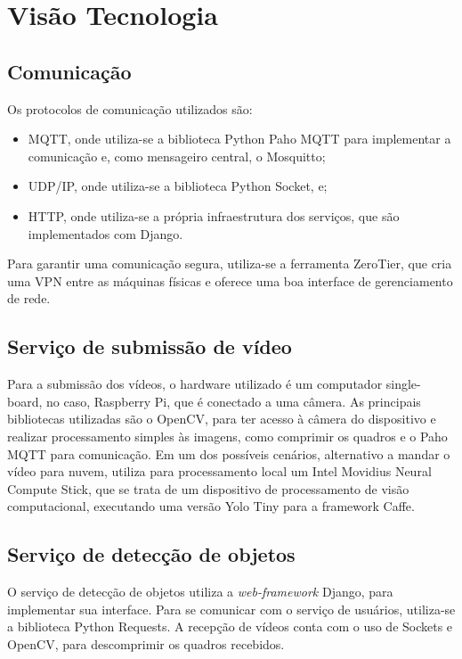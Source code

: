 \documentclass[]{politex}
\begin{document}
\section{Visão Tecnologia}

\subsection{Comunicação}
Os protocolos de comunicação utilizados são:
\begin{itemize}
    \item MQTT, onde utiliza-se a biblioteca Python Paho MQTT para implementar a comunicação e, como mensageiro central, o Mosquitto;
    \item UDP/IP, onde utiliza-se a biblioteca Python Socket, e;
    \item HTTP, onde utiliza-se a própria infraestrutura dos serviços, que são implementados com Django.
\end{itemize}

Para garantir uma comunicação segura, utiliza-se a ferramenta ZeroTier, que cria uma VPN entre as máquinas físicas e oferece uma boa interface de gerenciamento de rede.

\subsection{Serviço de submissão de vídeo}
Para a submissão dos vídeos, o hardware utilizado é um computador single-board, no caso, Raspberry Pi, que é conectado a uma câmera. As principais bibliotecas utilizadas são o OpenCV, para ter acesso à câmera do dispositivo e realizar processamento simples às imagens, como comprimir os quadros e o Paho MQTT para comunicação. Em um dos possíveis cenários, alternativo a mandar o vídeo para nuvem, utiliza para processamento local um Intel Movidius Neural Compute Stick, que se trata de um dispositivo de processamento de visão computacional, executando uma versão Yolo Tiny para a framework Caffe.

\subsection{Serviço de detecção de objetos}
O serviço de detecção de objetos utiliza a \textit{web-framework} Django, para implementar sua interface. Para se comunicar com o serviço de usuários, utiliza-se a biblioteca Python Requests. A recepção de vídeos conta com o uso de Sockets e OpenCV, para descomprimir os quadros recebidos.
\end{document}
